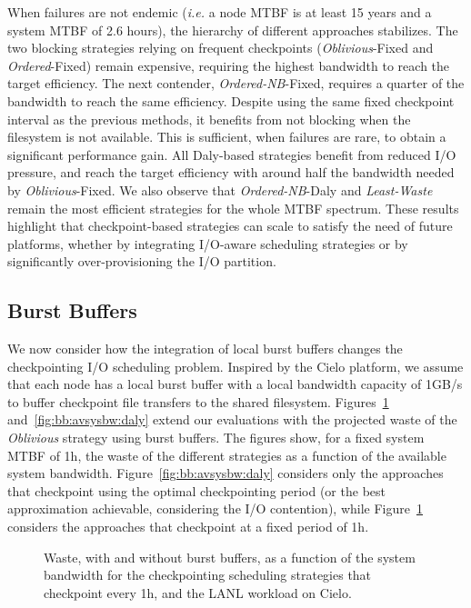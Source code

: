 \documentclass[two]{article}
\newcommand{\ie}[0]{\emph{i.e.}\xspace}
\newcommand{\nocoop}{\emph{Oblivious}\xspace}
\newcommand{\fifoblock}{\emph{Ordered}\xspace}
\newcommand{\fifononblock}{\emph{Ordered-NB}\xspace}
\newcommand{\leastwaste}{\emph{Least-Waste}\xspace}
\def\propfixed{\nocoop-Fixed\xspace}
\def\bfifofixed{\fifoblock-Fixed\xspace}
\def\fifofixed{\fifononblock-Fixed\xspace}
\def\fifodaly{\fifononblock-Daly\xspace}
\begin{document}
When failures are not endemic (\ie a node MTBF is at least 15 years
and a system MTBF of 2.6 hours), the hierarchy of different
approaches stabilizes. The two blocking strategies relying on
frequent checkpoints (\propfixed and \bfifofixed) remain expensive,
requiring the highest bandwidth to reach the target
efficiency. %
The next contender, \fifofixed, requires a quarter of the  bandwidth
to reach the same efficiency.
Despite using the same fixed checkpoint interval as the previous methods, it
benefits from not blocking when the filesystem is not available.
This is sufficient, when failures are rare, to obtain a significant
performance gain. %
All Daly-based strategies benefit from reduced I/O pressure, and reach the
target efficiency with around half the bandwidth needed by \propfixed. 
We also observe that \fifodaly and \leastwaste remain the most efficient strategies
for the whole MTBF spectrum. These
results highlight that checkpoint-based strategies can scale to
satisfy the need of future platforms, whether by integrating I/O-aware scheduling
strategies or by significantly over-provisioning the I/O partition.

\subsection{Burst Buffers}

We now consider how the integration of local burst buffers changes the checkpointing
I/O scheduling problem. Inspired by the Cielo platform, we assume that each node has
a local burst buffer with a local bandwidth capacity of 1GB/s to buffer checkpoint
file transfers to the shared filesystem. Figures~\ref{fig:bb:avsysbw:fixed}
and~\ref{fig:bb:avsysbw:daly} extend our evaluations with the
projected waste of the \nocoop strategy using burst buffers. The figures show, for a
fixed system MTBF of 1h, the waste of the different strategies as a function of the
available system bandwidth. Figure~\ref{fig:bb:avsysbw:daly} considers only the
approaches that checkpoint using the optimal checkpointing period (or the best
approximation achievable, considering the I/O contention), while
Figure~\ref{fig:bb:avsysbw:fixed} considers the approaches that checkpoint at a fixed
period of 1h.

\begin{figure}
  \begin{center}
    \resizebox{1.05\linewidth}{!}{}
  \end{center}
  \caption{Waste, with and without burst buffers, as a function of the system bandwidth for the
    checkpointing scheduling strategies
    that checkpoint every 1h, and the LANL workload on
    Cielo.\label{fig:bb:avsysbw:fixed}}
\end{figure}
\end{document}
